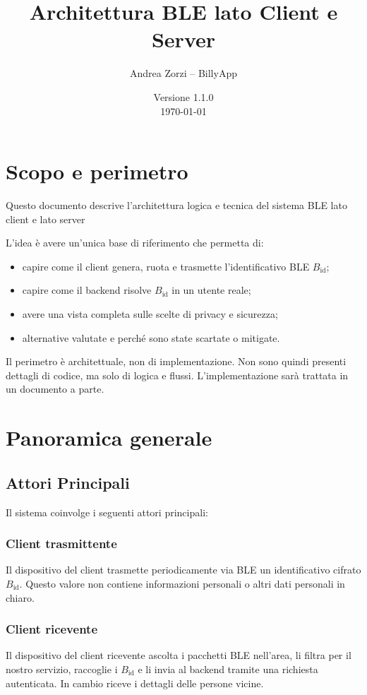 \documentclass[a4paper,11pt]{article}
\title{Architettura BLE lato Client e Server}
\author{Andrea Zorzi -- BillyApp}
\date{Versione 1.1.0 \\ \today}
\begin{document}
\maketitle

\tableofcontents

\newpage

\section{Scopo e perimetro}

Questo documento descrive l’architettura logica e tecnica del sistema BLE lato client e lato server

L'idea è avere un'unica base di riferimento che permetta di:
\begin{itemize}
  \item capire come il client genera, ruota e trasmette l'identificativo BLE \(B_{\text{id}}\);
  \item capire come il backend risolve \(B_{\text{id}}\) in un utente reale;
  \item avere una vista completa sulle scelte di privacy e sicurezza;
  \item alternative valutate e perché sono state scartate o mitigate.
\end{itemize}

Il perimetro è architettuale, non di implementazione. Non sono quindi presenti dettagli di codice, ma solo di logica e flussi.
L'implementazione sarà trattata in un documento a parte.

\section{Panoramica generale}
\subsection{Attori Principali}
Il sistema coinvolge i seguenti attori principali:
\subsubsection{Client trasmittente}
Il dispositivo del client trasmette periodicamente via BLE un identificativo cifrato \(B_{\text{id}}\).
Questo valore non contiene informazioni personali o altri dati personali in chiaro.

\subsubsection{Client ricevente}
Il dispositivo del client ricevente ascolta i pacchetti BLE nell'area, li filtra per il nostro servizio, raccoglie i \(B_{\text{id}}\) e li invia al backend tramite
una richiesta autenticata. In cambio riceve i dettagli delle persone vicine.
\end{document}
